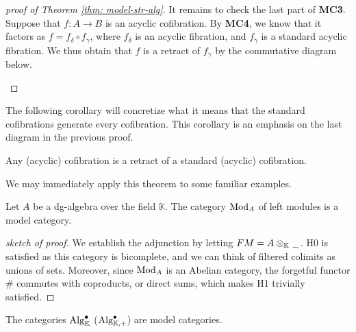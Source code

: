 \documentclass[../thesis.tex]{subfiles}
\begin{document}
\begin{proof}[proof of Theorem \ref{thm: model-str-alg}]
                It remains to check the last part of \textbf{MC3}. Suppose that $f: A\rightarrow B$ is an acyclic cofibration. By \textbf{MC4}, we know that it factors as $f = f_\delta \circ f_\gamma$, where $f_\delta$ is an acyclic fibration, and $f_\gamma$ is a standard acyclic fibration. We thus obtain that $f$ is a retract of $f_\gamma$ by the commutative diagram below.
                \begin{center}
                \end{center}
            \end{proof}

            The following corollary will concretize what it means that the standard cofibrations generate every cofibration. This corollary is an emphasis on the last diagram in the previous proof.

            \begin{corollary}
                Any (acyclic) cofibration is a retract of a standard (acyclic) cofibration.
            \end{corollary}

            We may immediately apply this theorem to some familiar examples.

            \begin{corollary}\label{cor: Model-Mod}
                Let $A$ be a dg-algebra over the field $\mathbb{K}$. The category $\tt{Mod}_A$ of left modules is a model category.
            \end{corollary}

            \begin{proof}[sketch of proof]
                We establish the adjunction by letting $FM = A\otimes_\mathbb{K}\argument$. H0 is satisfied as this category is bicomplete, and we can think of filtered colimits as unions of sets. Moreover, since $\tt{Mod}_A$ is an Abelian category, the forgetful functor $\#$ commutes with coproducts, or direct sums, which makes H1 trivially satisfied.
            \end{proof}

            \begin{corollary}
                The categories $\tt{Alg}^\bullet_\mathbb{K}$ ($\tt{Alg}^\bullet_{\mathbb{K},+}$) are model categories.
            \end{corollary}
\end{document}
